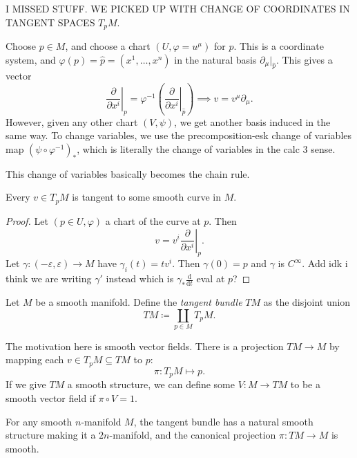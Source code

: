 
I MISSED STUFF. WE PICKED UP WITH CHANGE OF COORDINATES IN TANGENT SPACES $T_pM$.

Choose $p\in M$, and choose a chart $(U,\varphi =u^\mu )$ for $p$. This is a coordinate system, and $\varphi (p)=\hat{p} =(x^1, \ldots ,x^n)$ in the natural basis $\partial _\mu |_{\hat{p} } $. This gives a vector
\[
	\left.\frac{\partial }{\partial x^i} \right|_p = \varphi ^{-1} \left( \left.\frac{\partial }{\partial x^i} \right|_{\hat{p} }  \right)  \implies v=v^\mu \partial _\mu 
.\]
However, given any other chart $(V,\psi )$, we get another basis induced in the same way. To change variables, we use the precomposition-esk change of variables map $(\psi \circ \varphi ^{-1} )_*$, which is literally the change of variables in the calc 3 sense.

This change of variables basically becomes the chain rule.

\begin{lemma}\label{askj}
	Every $v\in T_pM$ is tangent to some smooth curve in $M$.
\end{lemma}
\begin{proof}
	Let $(p\in U,\varphi )$ a chart of the curve at $p$. Then
	\[
		v=v^i \left.\frac{\partial }{\partial x^i} \right|_p
	.\]
	Let $\gamma : (-\varepsilon ,\varepsilon) \to M$ have $\gamma _i(t)=tv^i$. Then $\gamma (0)=p$ and $\gamma $ is $C^\infty $. Add idk i think we are writing $\gamma '$ instead which is $\gamma _* \frac{\mathrm{d}}{\mathrm{d}t} $ eval at $p$?
\end{proof}

\begin{definition}\label{1.2.20}
	Let $M$ be a smooth manifold. Define the \emph{tangent bundle} $TM$ as the disjoint union
	\[
		TM\coloneqq \coprod_{p\in M} T_pM
	.\]
\end{definition}

The motivation here is smooth vector fields. There is a projection $TM\to M$ by mapping each $v\in T_pM\subseteq TM$ to $p$:
\[
	\pi : T_pM \mapsto p
.\]
If we give $TM$ a smooth structure, we can define some $V : M \to TM$ to be a smooth vector field if $\pi \circ V=1$.

\begin{proposition}\label{1.2.21}
	For any smooth $n$-manifold $M$, the tangent bundle has a natural smooth structure making it a $2n$-manifold, and the canonical projection $\pi : TM \to M$ is smooth.
\end{proposition}

